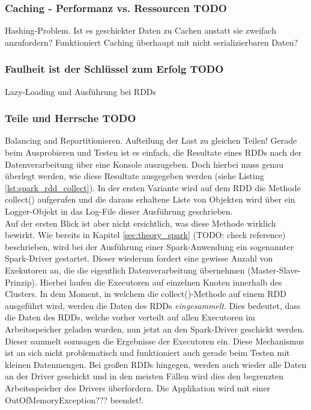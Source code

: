 \subsubsection*{Caching - Performanz vs. Ressourcen TODO}
Hashing-Problem. Ist es geschickter Daten zu Cachen anstatt sie zweifach anzufordern?
Funktioniert Caching überhaupt mit nicht serializierbaren Daten?
\subsubsection*{Faulheit ist der Schlüssel zum Erfolg TODO}
Lazy-Loading und Ausführung bei RDDs

\subsubsection*{Teile und Herrsche TODO}
Balancing and Repartitionieren. Aufteilung der Last zu gleichen Teilen!
Gerade beim Ausprobieren und Testen ist es einfach, die Resultate eines RDDs nach der Datenverarbeitung über eine Konsole auszugeben. Doch hierbei muss genau überlegt werden, wie diese Resultate ausgegeben werden (siehe Listing \ref{lst:spark_rdd_collect}). In der ersten Variante wird auf dem RDD die Methode collect() aufgerufen und die daraus erhaltene Liste von Objekten wird über ein Logger-Objekt in das Log-File dieser Ausführung geschrieben.\\
Auf der ersten Blick ist aber nicht ersichtlich, was diese Methode wirklich bewirkt. Wie bereits in Kapitel \ref{sec:theory_spark} (TODO: check reference) beschrieben, wird bei der Ausführung einer Spark-Anwendung ein sogenannter Spark-Driver gestartet. Dieser wiederum fordert eine gewisse Anzahl von Exekutoren an, die die eigentlich Datenverarbeitung übernehmen (Master-Slave-Prinzip). Hierbei laufen die Executoren auf einzelnen Knoten innerhalb des Clusters. In dem Moment, in welchem die collect()-Methode auf einem RDD ausgeführt wird, werden die Daten des RDDs \textit{eingesammelt}. Dies bedeutet, dass die Daten des RDDs, welche vorher verteilt auf allen Executoren im Arbeitsspeicher geladen wurden, nun jetzt an den Spark-Driver geschickt werden. Dieser sammelt sozusagen die Ergebnisse der Executoren ein. Diese Mechanismus ist an sich nicht problematisch und funktioniert auch gerade beim Testen mit kleinen Datenmengen. Bei großen RDDs hingegen, werden auch wieder alle Daten an der Driver geschickt und in den meisten Fällen wird dies den begrenzten Arbeitsspeicher des Drivers überfordern. Die Applikation wird mit einer OutOfMemoryException??? beendet!.\\

